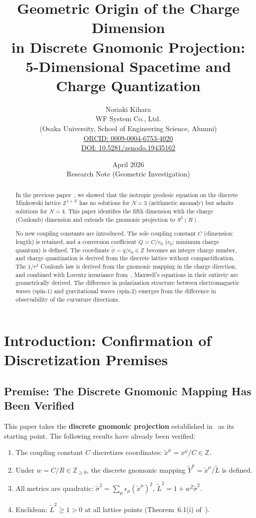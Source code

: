 \documentclass[12pt,a4paper]{article}
\title{\textbf{Geometric Origin of the Charge Dimension\\in Discrete Gnomonic Projection:\\5-Dimensional Spacetime and Charge Quantization}}
\author{Noriaki Kihara\\
\small WF System Co., Ltd.\\
\small (Osaka University, School of Engineering Science, Alumni)\\
\small \href{https://orcid.org/0009-0004-6753-4020}{ORCID: 0009-0004-6753-4020}\\
\small \href{https://doi.org/10.5281/zenodo.19435162}{DOI: 10.5281/zenodo.19435162}}
\date{April 2026\\[5pt]\small Research Note (Geometric Investigation)}
\begin{document}
\maketitle

\begin{abstract}
In the previous paper~\cite{Paper2}, we showed that the isotropic geodesic equation on the discrete Minkowski lattice $\mathbb{Z}^{1+N}$ has no solutions for $N=3$ (arithmetic anomaly) but admits solutions for $N=4$. This paper identifies the fifth dimension with the charge (Coulomb) dimension and extends the gnomonic projection to $S^5(R)$.

No new coupling constants are introduced. The sole coupling constant $C$ (dimension: length) is retained, and a conversion coefficient $Q = C/e_0$ ($e_0$: minimum charge quantum) is defined. The coordinate $\tilde{\phi} = q/e_0 \in \mathbb{Z}$ becomes an integer charge number, and charge quantization is derived from the discrete lattice without compactification. The $1/r^2$ Coulomb law is derived from the gnomonic mapping in the charge direction, and combined with Lorentz invariance from~\cite{Paper2}, Maxwell's equations in their entirety are geometrically derived. The difference in polarization structure between electromagnetic waves (spin-1) and gravitational waves (spin-2) emerges from the difference in observability of the curvature directions.
\end{abstract}

\tableofcontents

\section{Introduction: Confirmation of Discretization Premises}

\subsection{Premise: The Discrete Gnomonic Mapping Has Been Verified}

This paper takes the \textbf{discrete gnomonic projection} established in~\cite{Paper2} as its starting point. The following results have already been verified:

\begin{enumerate}
\item The coupling constant $C$ discretizes coordinates: $\tilde{x}^\mu = x^\mu/C \in \mathbb{Z}$.
\item Under $w = C/R \in \mathbb{Z}_{\geq 0}$, the discrete gnomonic mapping $\tilde{Y}^\mu = \tilde{x}^\mu/\tilde{L}$ is defined.
\item All metrics are quadratic: $\tilde{\sigma}^2 = \sum_\mu \epsilon_\mu (\tilde{x}^\mu)^2$, $\tilde{L}^2 = 1 + w^2\tilde{\sigma}^2$.
\item Euclidean: $\tilde{L}^2 \geq 1 > 0$ at all lattice points (Theorem~6.1(i) of~\cite{Paper2}).
\end{enumerate}
\end{document}
